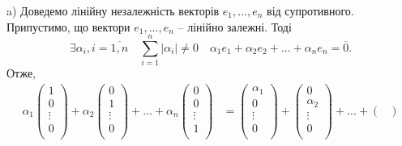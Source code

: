 \begin{example}
    a) Доведемо лінійну незалежність векторів $e_1, ..., e_n$ від супротивного.
    Припустимо, що вектори $e_1, ..., e_n$ -- лінійно залежні. Тоді
    \begin{equation*}
        \exists \alpha_i, i = \overline{1,n}
        \quad \sum\limits_{i=1}^n |\alpha_i| \neq 0
        \quad \alpha_1 e_1 + \alpha_2 e_2 + ... + \alpha_n e_n = \overline{0}.
    \end{equation*}
    Отже,
    \begin{equation*}
        \begin{split}
            \alpha_1 \begin{pmatrix}
                1  \\
                0  \\
                \vdots  \\
                0  \\
            \end{pmatrix} + \alpha_2 \begin{pmatrix}
                0  \\
                1  \\
                \vdots  \\
                0  \\
            \end{pmatrix} + ... + \alpha_n \begin{pmatrix}
                0  \\
                0  \\
                \vdots  \\
                1  \\
            \end{pmatrix}
            & = \begin{pmatrix}
                \alpha_1  \\
                0  \\
                \vdots  \\
                0  \\
            \end{pmatrix} + \begin{pmatrix}
                0  \\
                \alpha_2  \\
                \vdots  \\
                0  \\
            \end{pmatrix} + ... + \begin{pmatrix}

\end{pmatrix}
\end{split}
\end{equation*}
\end{example}
